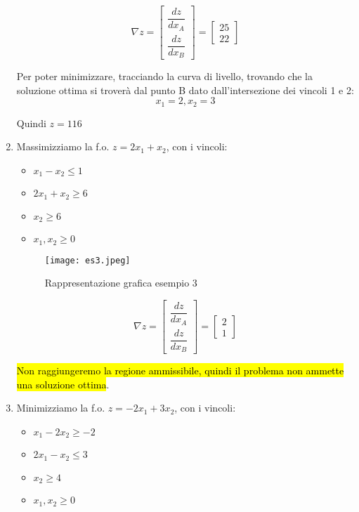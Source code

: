 \begin{enumerate}
		$$\nabla z = \left[\begin{array}{c}
			\dfrac{dz}{dx_A}\\
			\dfrac{dz}{dx_B}
		\end{array}\right] = \left[\begin{array}{c}
			25\\
			22
		\end{array}\right]
		$$
		
		Per poter minimizzare, tracciando la curva di livello, trovando che la soluzione ottima si troverà dal punto B dato dall'intersezione dei vincoli 1 e 2:
		$$x_1 = 2, x_2 = 3$$
		
		Quindi $z= 116$
		
	\item Massimizziamo la f.o. $z = 2x_1 + x_2$, con i vincoli:
		\begin{itemize}
			\item $x_1 - x_2 \leq 1$
			\item $2x_1 + x_2 \geq 6$
			\item $x_2 \geq 6$
			\item $x_1, x_2 \geq 0$
		\end{itemize}
		
		\begin{figure}[H]
		\centering
		\texttt{[image: es3.jpeg]}
		\caption{Rappresentazione grafica esempio 3} 
		\label{rge3}
		\end{figure}
		
		$$\nabla z = \left[\begin{array}{c}
			\dfrac{dz}{dx_A}\\
			\dfrac{dz}{dx_B}
		\end{array}\right] = \left[\begin{array}{c}
			2\\
			1
		\end{array}\right]
		$$
		
		\hl{Non raggiungeremo la regione ammissibile, quindi il problema non ammette una soluzione ottima}.
		
	\item Minimizziamo la f.o. $z = -2x_1 + 3x_2$, con i vincoli:
		\begin{itemize}
			\item $x_1 - 2x_2 \geq -2$
			\item $2x_1 - x_2 \leq 3$
			\item $x_2 \geq 4$
			\item $x_1, x_2 \geq 0$
		\end{itemize}
		

\end{enumerate}
